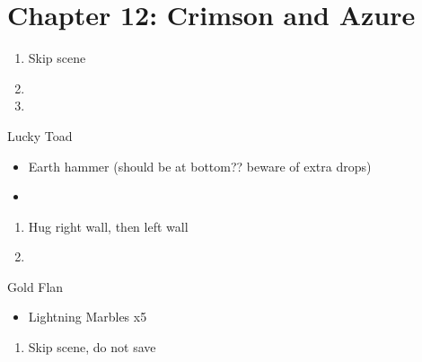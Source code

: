 \chapter{Chapter 12: Crimson and Azure}
\begin{enumerate}
    \item Skip scene
    \item {}
    \item {}
\end{enumerate}

\begin{battle}{Lucky Toad}
    \begin{itemize}
        \item Earth hammer (should be at bottom?? beware of extra drops)
        \item \imprism\
    \end{itemize}
\end{battle}

\begin{enumerate}[resume]
    \item Hug right wall, then left wall
    \item \save\
\end{enumerate}

\begin{battle}{Gold Flan}
    \begin{itemize}
        \item Lightning Marbles x5
    \end{itemize}
\end{battle}

\begin{enumerate}[resume]
    \item Skip scene, do not save
\end{enumerate}